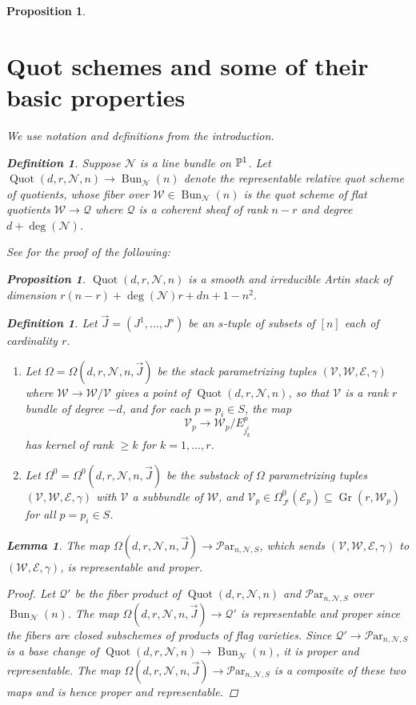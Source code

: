 \documentclass[11pt]{amsart}
\newcommand\op{\operatorname}
\newcommand\me{\mathcal{E}}
\newcommand\mv{\mathcal{V}}
\newcommand\mw{\mathcal{W}}
\newcommand\mq{\mathcal{Q}}
\newcommand\mn{\mathcal{N}}
\newcommand\Par{\mathcal{P}\text{ar} }
\newcommand\Gr{\operatorname{Gr}}
\newcommand\Bun{\operatorname{Bun}}
\newcommand\Quot{\operatorname{Quot}}
\newtheorem{proposition}[theorem]{Proposition}
\newtheorem{lemma}[theorem]{Lemma}
\newtheorem{defi}[theorem]{Definition}
\numberwithin{theorem}{subsection}
\begin{document}
{\begin{proposition}
\section{Quot schemes and some of their basic properties}\label{quot1}
We use notation and definitions  from the introduction.
\begin{defi}Suppose $\mn$ is a line bundle on $\Bbb{P}^1$. Let $\op{Quot}(d,r,\mn,n)\to \op{Bun}_{\mn}(n)$ denote the representable relative quot scheme of quotients, whose fiber over $\mw\in \op{Bun}_{\mn}(n)$ is the quot scheme of flat quotients $\mw\to\mq$ where $\mq$ is a coherent sheaf of rank $n-r$ and degree $d+\deg(\mn)$.
\end{defi}
See \cites{Laumon,CF} for the proof of the following:
\begin{proposition}\label{laumon}
$\Quot(d,r,\mn,n)$ is a smooth and irreducible Artin stack of dimension $r(n-r) +\deg(\mn)r +dn +1-n^2.$
\end{proposition}

\begin{defi}\label{mindful}
Let $\vec{J}=(J^1,\dots,J^s)$ be an $s$-tuple of subsets  of $[n]$ each of cardinality $r$.
\begin{enumerate}
\item Let $\Omega=\Omega(d,r,\mn,n,\vec{J})$ be the stack parametrizing
tuples $(\mv,\mw,\me,\gamma)$ where $\mw\to \mw/\mv$ gives a point of $\Quot(d,r,\mn,n)$, so that $\mv$ is a rank $r$ bundle of degree $-d$, and for each $p=p_i\in S$, the map
 $$\mv_p\to \mw_p/E^p_{j^i_k}$$
 has kernel of rank $\geq k$ for $k=1,\dots,r$.
\item Let $\Omega^0=\Omega^0(d,r,\mn,n,\vec{J})$ be the substack of $\Omega$ parametrizing tuples $(\mv,\mw,\me,\gamma)$ with $\mv$ a subbundle of $\mw$, and $\mv_p\in \Omega^0_{J^i}(\me_p)\subseteq \Gr(r,\mw_p)$ for all $p=p_i\in S$.
\end{enumerate}
\end{defi}
\begin{lemma}\label{repres}
The map $\Omega(d,r,\mn,n,\vec{J})\to \Par_{n,\mn,S}$, which sends $(\mv,\mw,\me,\gamma)$ to $(\mw,\me,\gamma)$, is representable and proper.
\end{lemma}
\begin{proof}
Let $\mathcal{Q}'$ be the fiber product of  $\Quot(d,r,\mn,n)$ and  $\Par_{n,\mn,S}$ over $\Bun_{\mathcal{N}}(n)$. The map  $\Omega(d,r,\mn,n,\vec{J})\to \mathcal{Q}'$ is representable and proper since the fibers are closed subschemes of products of flag varieties. Since  $\mathcal{Q}'\to \Par_{n,\mn,S}$ is a base change of $\Quot(d,r,\mn,n)\to \Bun_{\mathcal{N}}(n)$, it is proper and representable. The map $\Omega(d,r,\mn,n,\vec{J})\to \Par_{n,\mn,S}$ is a composite of these two maps and is hence  proper and representable.


\end{proof}
\end{proposition}}
\end{document}
